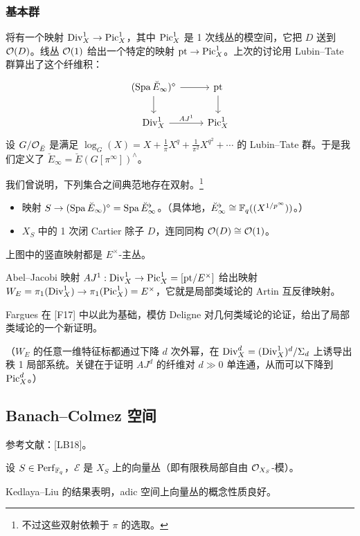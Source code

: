 \subsubsection{基本群}

将有一个映射 $\mathrm{Div}^1_X\to\operatorname{Pic}^1_X$，其中 $\operatorname{Pic}^1_X$ 是 1 次线丛的模空间，它把 $D$ 送到 $\mathcal{O}(D)$。线丛 $\mathcal{O}(1)$ 给出一个特定的映射 $\mathrm{pt}\to\operatorname{Pic}^1_X$。上次的讨论用 Lubin--Tate 群算出了这个纤维积：
\[
\begin{tikzcd}
(\Spa\breve E_\infty)^\diamond \arrow[r] \arrow[d] & \mathrm{pt} \arrow[d]\\
\Div^1_X \arrow[r,"AJ^1"] & \Pic^1_X
\end{tikzcd}
\]
设 $G/\mathcal{O}_{\breve E}$ 是满足 $\log_G(X)=X+\frac{1}{\pi}X^q+\frac{1}{\pi^2}X^{q^2}+\cdots$ 的 Lubin--Tate 群。于是我们定义了 $\breve E_\infty=\breve E(G[\pi^\infty])^{\wedge}$。

我们曾说明，下列集合之间典范地存在双射。\footnote{不过这些双射依赖于 $\pi$ 的选取。}
\begin{itemize}
  \item 映射 $S\to(\operatorname{Spa}\breve E_\infty)^\diamond=\operatorname{Spa}\breve E_\infty^\flat$。（具体地，$\breve E_\infty^\flat\cong\mathbb{F}_q((X^{1/p^\infty}))$。）
  \item $X_S$ 中的 1 次闭 Cartier 除子 $D$，连同同构 $\mathcal{O}(D)\cong\mathcal{O}(1)$。
\end{itemize}
上图中的竖直映射都是 $E^\times$-主丛。

Abel--Jacobi 映射 $AJ^1:\mathrm{Div}^1_X\to\operatorname{Pic}^1_X=[\mathrm{pt}/E^\times]$ 给出映射 $W_E=\pi_1(\mathrm{Div}^1_X)\to\pi_1(\operatorname{Pic}^1_X)=E^\times$，它就是局部类域论的 Artin 互反律映射。

Fargues 在 [F17] 中以此为基础，模仿 Deligne 对几何类域论的论证，给出了局部类域论的一个新证明。


（$W_E$ 的任意一维特征标都通过下降 $d$ 次外幂，在 $\mathrm{Div}^d_X=(\mathrm{Div}^1_X)^d/\Sigma_d$ 上诱导出秩 1 局部系统。关键在于证明 $AJ^d$ 的纤维对 $d\gg0$ 单连通，从而可以下降到 $\operatorname{Pic}^d_X$。）

\subsection{Banach--Colmez 空间}

参考文献：[LB18]。

设 $S\in\mathrm{Perf}_{\mathbb{F}_q}$，$\mathcal{E}$ 是 $X_S$ 上的向量丛（即有限秩局部自由 $\mathcal{O}_{X_S}$-模）。

Kedlaya--Liu 的结果表明，adic 空间上向量丛的概念性质良好。

